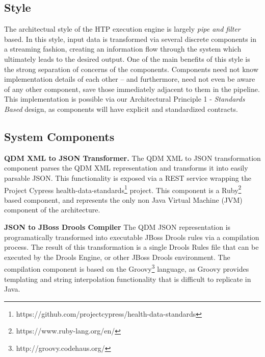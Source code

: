 \documentclass{amia}
\begin{document}
\subsection*{Style}
The architectual style of the HTP execution engine is largely \textit{pipe and filter} based. In this style, input data is transformed via several discrete components in a streaming fashion, creating an information flow through the system which ultimately leads to the desired output\cite{garlan1993introduction}. One of the main benefits of this style is the strong separation of concerns of the components. Components need not know implementation details of each other -- and furthermore, need not even be aware of any other component, save those immediately adjacent to them in the pipeline. This implementation is possible via our Architectural Principle 1 - \textit{Standards Based} design, as components will have explicit and standardized contracts.

\subsection*{System Components}
\textbf{QDM XML to JSON Transformer.}
The QDM XML to JSON transformation component parses the QDM XML representation and transforms it into easily parsable JSON. This functionality is exposed via a REST service wrapping the Project Cypress health-data-standards\footnote{https://github.com/projectcypress/health-data-standards} project. This component is a Ruby\footnote{https://www.ruby-lang.org/en/} based component, and represents the only non Java Virtual Machine (JVM) component of the architecture.

\textbf{JSON to JBoss Drools Compiler}
The QDM JSON representation is programatically transformed into executable JBoss Drools rules via a compilation process. The result of this transformation is a single Drools Rules file that can be executed by the Drools Engine, or other JBoss Drools environment. The compilation component is based on the Groovy\footnote{http://groovy.codehaus.org/} language, as Groovy provides templating and string interpolation functionality that is difficult to replicate in Java.
\end{document}
